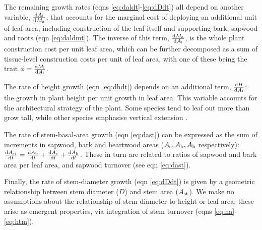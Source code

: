 \documentclass[9pt,twocolumn,twoside]{pnas-new}
\begin{document}
The remaining growth rates (eqns \ref{eq:daldt}-\ref{eq:dDdt}) all depend on another variable, $\frac{{\rm d}A_{\rm l}} {{\rm d}M_{\rm a}}$, that accounts for the marginal cost of deploying an additional unit of leaf area, including construction of the leaf itself and supporting  bark, sapwood and roots (eqn \ref{eq:daldmt}). The inverse of this term, $\frac{{\rm d}M_{\rm a} }{{\rm d}A_{\rm l}}$, is the whole plant construction cost per unit leaf area, which can be further decomposed as a sum of tissue-level construction costs per unit of leaf area, with one of these being the trait $\phi = \frac{{\rm d}M_{\rm l} }{{\rm d}A_{\rm l}}$.

The rate of height growth (eqn \ref{eq:dhdt}) depends on an additional term, $\frac{{\rm d}H }{{\rm d}A_{\rm l}}$: the growth in plant height per unit growth in leaf area. This variable accounts for the architectural strategy of the plant. Some species tend to leaf out more than grow tall, while other species emphasise vertical extension \citep{Poorter-2006}.

The rate of stem-basal-area growth (eqn \ref{eq:dast}) can be expressed as the sum of increments in sapwood, bark and heartwood areas ($A_{\rm s}, A_{\rm b}, A_{\rm h}$ respectively): $\frac{{\rm d}A_{\rm st}}{{\rm d}t}= \frac{{\rm d}A_{\rm b}}{{\rm d}t} + \frac{{\rm d}A_{\rm s}}{{\rm d}t} + \frac{{\rm d}A_{\rm h}}{{\rm d}t}$. These in turn are related to ratios of sapwood and bark area per leaf area, and sapwood turnover (see eqn \ref{eq:dast}).

Finally, the rate of stem-diameter growth (eqn \ref{eq:dDdt}) is given by a geometric relationship between stem diameter ($D$) and stem area ($A_{\rm st}$). We make no assumptions about the relationship of stem diameter to height or leaf area: these arise as emergent properties, via integration of stem turnover (eqns \ref{eq:ha}-\ref{eq:htm}).
\end{document}
